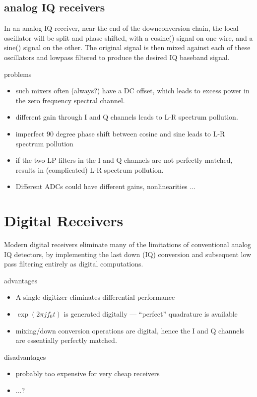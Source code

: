 \subsection{analog IQ receivers}

In an analog IQ receiver, near the end of the downconversion chain,
the local oscillator will be split and phase shifted, with a cosine()
signal on one wire, and a sine() signal on the other.  The original
signal is then mixed against each of these oscillators and lowpass
filtered to produce the desired IQ baseband signal.

problems
\begin{itemize}
\item such mixers often (always?) have a DC offset, which leads to
  excess power in the zero frequency spectral channel.
\item different gain through I and Q channels leads to L-R spectrum
  pollution.
\item imperfect 90 degree phase shift between cosine and sine leads to
  L-R spectrum pollution
\item if the two LP filters in the I and Q channels are not perfectly
  matched, results in (complicated) L-R spectrum pollution.
\item Different ADCs could have different gains, nonlinearities ...
\end{itemize}

\section{Digital Receivers}

Modern digital receivers eliminate many of the limitations of
conventional analog IQ detectors, by implementing the last down
(IQ) conversion and subsequent low pass filtering entirely as digital
computations. 

advantages
\begin{itemize}
\item A single digitizer eliminates differential performance
\item $\exp(2\pi j f_0 t)$ is generated digitally --- ``perfect''
  quadrature is available
\item mixing/down conversion operations are digital, hence the I and Q
  channels are essentially perfectly matched.
\end{itemize}

disadvantages
\begin{itemize}
\item probably too expensive for very cheap receivers
\item ...?
\end{itemize}

